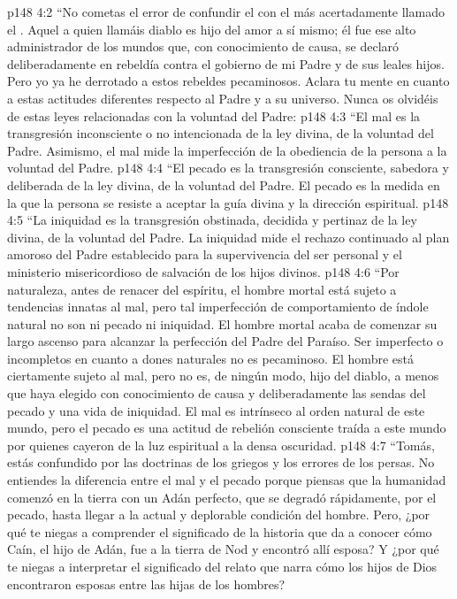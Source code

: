 \vs p148 4:2 \pc “No cometas el error de confundir el  con el  más acertadamente llamado el . Aquel a quien llamáis diablo es hijo del amor a sí mismo; él fue ese alto administrador de los mundos que, con conocimiento de causa, se declaró deliberadamente en rebeldía contra el gobierno de mi Padre y de sus leales hijos. Pero yo ya he derrotado a estos rebeldes pecaminosos. Aclara tu mente en cuanto a estas actitudes diferentes respecto al Padre y a su universo. Nunca os olvidéis de estas leyes relacionadas con la voluntad del Padre:
\vs p148 4:3 “El mal es la transgresión inconsciente o no intencionada de la ley divina, de la voluntad del Padre. Asimismo, el mal mide la imperfección de la obediencia de la persona a la voluntad del Padre.
\vs p148 4:4 “El pecado es la transgresión consciente, sabedora y deliberada de la ley divina, de la voluntad del Padre. El pecado es la medida en la que la persona se resiste a aceptar la guía divina y la dirección espiritual.
\vs p148 4:5 “La iniquidad es la transgresión obstinada, decidida y pertinaz de la ley divina, de la voluntad del Padre. La iniquidad mide el rechazo continuado al plan amoroso del Padre establecido para la supervivencia del ser personal y el ministerio misericordioso de salvación de los hijos divinos.
\vs p148 4:6 “Por naturaleza, antes de renacer del espíritu, el hombre mortal está sujeto a tendencias innatas al mal, pero tal imperfección de comportamiento de índole natural no son ni pecado ni iniquidad. El hombre mortal acaba de comenzar su largo ascenso para alcanzar la perfección del Padre del Paraíso. Ser imperfecto o incompletos en cuanto a dones naturales no es pecaminoso. El hombre está ciertamente sujeto al mal, pero no es, de ningún modo, hijo del diablo, a menos que haya elegido con conocimiento de causa y deliberadamente las sendas del pecado y una vida de iniquidad. El mal es intrínseco al orden natural de este mundo, pero el pecado es una actitud de rebelión consciente traída a este mundo por quienes cayeron de la luz espiritual a la densa oscuridad.
\vs p148 4:7 “Tomás, estás confundido por las doctrinas de los griegos y los errores de los persas. No entiendes la diferencia entre el mal y el pecado porque piensas que la humanidad comenzó en la tierra con un Adán perfecto, que se degradó rápidamente, por el pecado, hasta llegar a la actual y deplorable condición del hombre. Pero, ¿por qué te niegas a comprender el significado de la historia que da a conocer cómo Caín, el hijo de Adán, fue a la tierra de Nod y encontró allí esposa? Y ¿por qué te niegas a interpretar el significado del relato que narra cómo los hijos de Dios encontraron esposas entre las hijas de los hombres?
